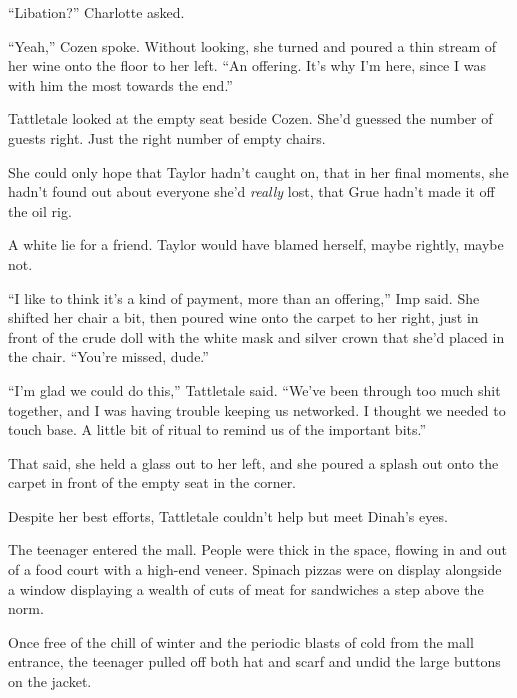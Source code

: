``Libation?'' Charlotte asked.



``Yeah,'' Cozen spoke.  Without looking, she turned and poured a thin stream of her wine onto the floor to her left.  ``An offering.  It's why I'm here, since I was with him the most towards the end.''



Tattletale looked at the empty seat beside Cozen.  She'd guessed the number of guests right.  Just the right number of empty chairs.



She could only hope that Taylor hadn't caught on, that in her final moments, she hadn't found out about everyone she'd \emph{really} lost, that Grue hadn't made it off the oil rig.



A white lie for a friend.  Taylor would have blamed herself, maybe rightly, maybe not.



``I like to think it's a kind of payment, more than an offering,'' Imp said.  She shifted her chair a bit, then poured wine onto the carpet to her right, just in front of the crude doll with the white mask and silver crown that she'd placed in the chair.  ``You're missed, dude.''



``I'm glad we could do this,'' Tattletale said.  ``We've been through too much shit together, and I was having trouble keeping us networked.  I thought we needed to touch base.  A little bit of ritual to remind us of the important bits.''



That said, she held a glass out to her left, and she poured a splash out onto the carpet in front of the empty seat in the corner.



Despite her best efforts, Tattletale couldn't help but meet Dinah's eyes.



\sectionbreak



The teenager entered the mall.  People were thick in the space, flowing in and out of a food court with a high-end veneer.  Spinach pizzas were on display alongside a window displaying a wealth of cuts of meat for sandwiches a step above the norm.



Once free of the chill of winter and the periodic blasts of cold from the mall entrance, the teenager pulled off both hat and scarf and undid the large buttons on the jacket.



